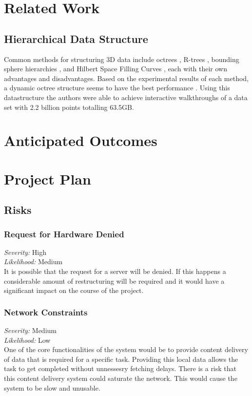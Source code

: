 \documentclass[12pt,a4paper]{article}
\begin{document}
\section{Related Work}
\subsection{Hierarchical Data Structure}
Common methods for structuring 3D data include octrees \cite{interactivepointclouds},
R-trees \cite{rtree}, bounding sphere hierarchies \cite{qsplat}, and Hilbert Space
Filling Curves \cite{hilbert}, each with their own advantages and disadvantages. Based
on the experimental results of each method, a dynamic octree structure seems to have
the best performance \cite{interactivepointclouds}. Using this datastructure the
authors were able to achieve interactive walkthroughs of a data set with 2.2
billion points totalling 63.5GB.

\section{Anticipated Outcomes}

\section{Project Plan}
\subsection{Risks}
\subsubsection*{Request for Hardware Denied}
\noindent \textit{Severity: } High \\
\noindent \textit{Likelihood: } Medium \\
It is possible that the request for a server will be denied. If this happens
a considerable amount of restructuring will be required and it would have a
significant impact on the course of the project.
\subsubsection*{Network Constraints}
\noindent \textit{Severity: } Medium \\
\noindent \textit{Likelihood: } Low \\
One of the core functionalities of the system would be to provide
content delivery of data that is required for a specific task. Providing
this local data allows the task to get completed without unnessesry
fetching delays. There is a risk that this content delivery system
could saturate the network. This would cause the system to be slow
and unusable.
\end{document}
